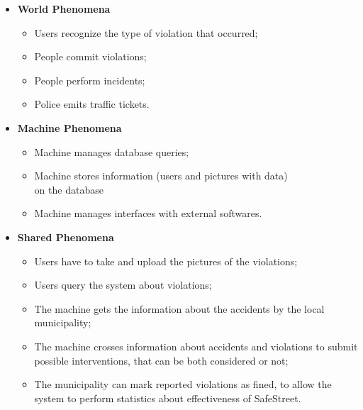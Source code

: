 \documentclass[../RASD.tex]{subfiles}
\begin{document}
    \begin{itemize}
        \item \textbf{World Phenomena}
        \begin{itemize}
            \item Users recognize the type of violation that occurred;
            \item People commit violations;
            \item People perform incidents;
            \item Police emits traffic tickets.
        \end{itemize}
        \item \textbf{Machine Phenomena}
        \begin{itemize}
            \item Machine manages database queries;
            \item Machine stores information (users and pictures with data)
            \\ on the database
            \item Machine manages interfaces with external softwares.
        \end{itemize}
        \item \textbf{Shared Phenomena}
        \begin{itemize}
            \item Users have to take and upload the pictures of the violations;
            \item Users query the system about violations;
            \item The machine gets the information about the accidents by the local municipality;
            \item The machine crosses information about accidents and violations to submit possible interventions, that can be both considered or not;
            \item The municipality can mark reported violations as fined, to allow the system to perform statistics about effectiveness of SafeStreet.
        \end{itemize}
    \end{itemize}
\end{document}
